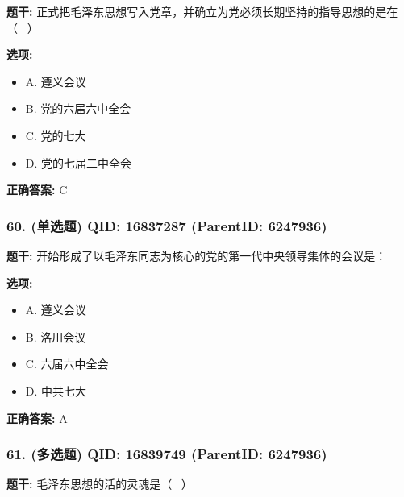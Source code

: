 \documentclass[12pt,UTF8]{ctexart}
\begin{document}
\textbf{题干:}
正式把毛泽东思想写入党章，并确立为党必须长期坚持的指导思想的是在（  ）



\textbf{选项:}
\begin{itemize}[leftmargin=*]

  \item A. 遵义会议

  \item B. 党的六届六中全会

  \item C. 党的七大

  \item D. 党的七届二中全会

\end{itemize}

\textbf{正确答案:}
C

\vspace{0.3em}\hrulefill\vspace{0.7em}

\subsubsection*{60. (单选题) \small QID: 16837287 (ParentID: 6247936)}

\textbf{题干:}
开始形成了以毛泽东同志为核心的党的第一代中央领导集体的会议是：



\textbf{选项:}
\begin{itemize}[leftmargin=*]

  \item A. 遵义会议

  \item B. 洛川会议

  \item C. 六届六中全会

  \item D. 中共七大

\end{itemize}

\textbf{正确答案:}
A

\vspace{0.3em}\hrulefill\vspace{0.7em}

\subsubsection*{61. (多选题) \small QID: 16839749 (ParentID: 6247936)}

\textbf{题干:}
毛泽东思想的活的灵魂是（  ）
\end{document}
